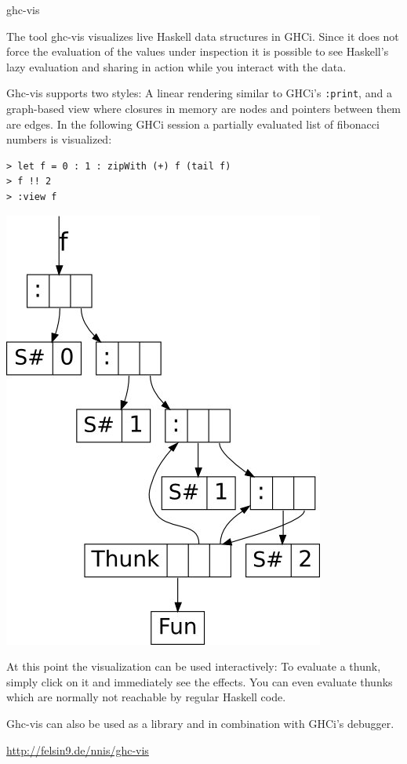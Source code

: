 \documentclass[DIV16,twocolumn,10pt]{scrreprt}
\begin{document}
\begin{hcarentry}{ghc-vis}
\makeheader

The tool ghc-vis visualizes live Haskell data structures in GHCi.
Since it does not force the evaluation of the values under inspection it is possible to see Haskell's lazy evaluation and sharing in action while you interact with the data.

Ghc-vis supports two styles: A linear rendering similar to GHCi's \texttt{:print}, and a graph-based view where closures in memory are nodes and pointers between them are edges.
In the following GHCi session a partially evaluated list of fibonacci numbers is visualized:

\begin{verbatim}
> let f = 0 : 1 : zipWith (+) f (tail f)
> f !! 2
> :view f
\end{verbatim}

\begin{center}
  \includegraphics[scale=.35]{fib.jpg}
\end{center}

At this point the visualization can be used interactively: To evaluate a thunk, simply click on it and immediately see the effects. You can even evaluate thunks which are normally not reachable by regular Haskell code.

Ghc-vis can also be used as a library and in combination with GHCi's debugger.

\FurtherReading
  \url{http://felsin9.de/nnis/ghc-vis}
\end{hcarentry}
\end{document}
